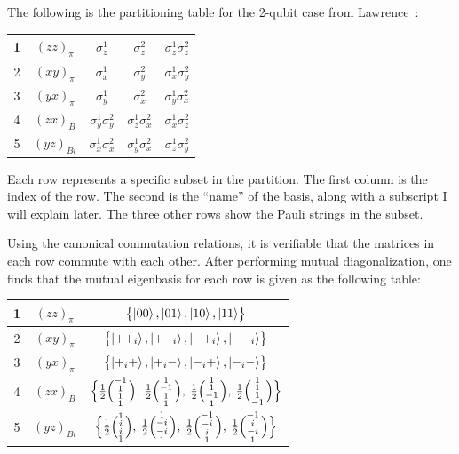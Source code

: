 \documentclass[a4paper,12pt]{article}
\newcommand{\qvect}[4]{%
  \ensuremath{\Bigl(\negthinspace\begin{smallmatrix}#1\\#2\\#3\\#4\end{smallmatrix}\Bigr)}}
\begin{document}
The following is the partitioning table for the 2-qubit case from Lawrence~\cite{lawrence_mutually_2002}:


\begin{table}[h]
    \centering
    \begin{tabular}{|c|c|c|c|c|}
        \hline
        1 & $(zz)_\pi$  & $\sigma_z^1$           & $\sigma_z^2$           & $\sigma_z^1\sigma_z^2$ \\ \hline
        2 & $(xy)_\pi$  & $\sigma_x^1$           & $\sigma_y^2$           & $\sigma_x^1\sigma_y^2$ \\ \hline
        3 & $(yx)_\pi$  & $\sigma_y^1$           & $\sigma_x^2$           & $\sigma_y^1\sigma_x^2$ \\ \hline
        4 & $(zx)_B$    & $\sigma_y^1\sigma_y^2$ & $\sigma_z^1\sigma_x^2$ & $\sigma_x^1\sigma_z^2$ \\ \hline
        5 & $(yz)_{Bi}$ & $\sigma_x^1\sigma_x^2$ & $\sigma_y^1\sigma_x^2$ & $\sigma_z^1\sigma_y^2$ \\ \hline
    \end{tabular}
\end{table}

Each row represents a specific subset in the partition.
The first column is the index of the row. The second is the ``name'' of the basis, along with a subscript I will explain later. The three other rows show the Pauli strings in the subset.

Using the canonical commutation relations, it is verifiable that the matrices in each row commute with each other.
After performing mutual diagonalization, one finds that the mutual eigenbasis for each row is given as the following table:

\begin{table}[h]
    \centering
    \begin{tabular}{|c|c|c|}
        \hline
        1 & $(zz)_\pi$  & $\bigl\{ \ket{00}, \ket{01}, \ket{10}, \ket{11}\bigr\}$ \\ \hline
        2 & $(xy)_\pi$  & $\bigl\{ \ket{++_i}, \ket{+-_i}, \ket{-+_i}, \ket{--_i}\bigr\}$ \\ \hline
        3 & $(yx)_\pi$  & $\bigl\{ \ket{+_i+}, \ket{+_i-}, \ket{-_i+}, \ket{-_i-}\bigr\}$ \\ \hline
        4 & $(zx)_B$    & $\Bigl\{ \frac{1}{2}\qvect{-1}{1}{1}{1},\: \frac{1}{2}\qvect{1}{-1}{1}{1},\: \frac{1}{2}\qvect{1}{1}{-1}{1},\: \frac{1}{2}\qvect{1}{1}{1}{-1}\Bigr\}$ \\ \hline
        5 & $(yz)_{Bi}$ & $\Bigl\{ \frac{1}{2}\qvect{1}{i}{i}{1},\: \frac{1}{2}\qvect{1}{-i}{-i}{1},\: \frac{1}{2}\qvect{-1}{-i}{i}{1},\: \frac{1}{2}\qvect{-1}{i}{-i}{1}\Bigr\}$ \\ \hline
    \end{tabular}
\end{table}
\end{document}
